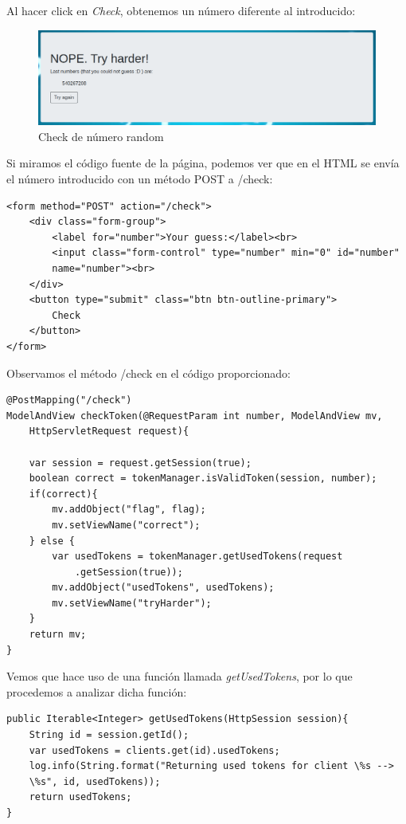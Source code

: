 \documentclass[12pt, a4paper,twoside,titlepage]{article}
\begin{document}
Al hacer click en \emph{Check}, obtenemos un número diferente al introducido:

\begin{figure}[H]
    \centering
    \includegraphics[width=1\linewidth]{Figuras/Adivina/3.png}
    \caption{Check de número random}
    \label{fig:adivina}
\end{figure}

Si miramos el código fuente de la página, podemos ver que en el HTML se envía el número introducido con un método POST a /check:

\begin{verbatim}
<form method="POST" action="/check">
    <div class="form-group">
        <label for="number">Your guess:</label><br>
        <input class="form-control" type="number" min="0" id="number" 
        name="number"><br>
    </div>
    <button type="submit" class="btn btn-outline-primary">
        Check
    </button>
</form>
\end{verbatim}

Observamos el método /check en el código proporcionado:

\begin{verbatim}
@PostMapping("/check")
ModelAndView checkToken(@RequestParam int number, ModelAndView mv, 
    HttpServletRequest request){
    
    var session = request.getSession(true);
    boolean correct = tokenManager.isValidToken(session, number);
    if(correct){
        mv.addObject("flag", flag);
        mv.setViewName("correct");
    } else {
        var usedTokens = tokenManager.getUsedTokens(request
            .getSession(true));
        mv.addObject("usedTokens", usedTokens);
        mv.setViewName("tryHarder");
    }
    return mv;
}
\end{verbatim}

Vemos que hace uso de una función llamada \emph{getUsedTokens}, por lo que procedemos a analizar dicha función:

\begin{verbatim}
public Iterable<Integer> getUsedTokens(HttpSession session){
    String id = session.getId();
    var usedTokens = clients.get(id).usedTokens;
    log.info(String.format("Returning used tokens for client \%s --> 
    \%s", id, usedTokens));
    return usedTokens;
}
\end{verbatim}
\end{document}
